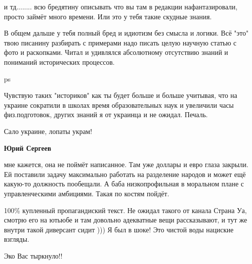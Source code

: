 \begin{itemize}
и тд........ всю бредятину описывать что вы там в редакции нафантазировали,
просто займёт много времени. Или это у тебя такие скудные знания.

В общем дальше у тебя полный бред и идиотизм без смысла и логики. Всё "это"
твою писанину разбирать с примерами надо писать целую научную статью с фото и
раскопками. Читал и удивлялся абсолютному отсутствию знаний и пониманий
исторических процессов.

ps

Чувствую таких "историков" как ты будет больше и больше учитывая, что на
украине сократили в школах время образовательных наук и увеличили часы
физ.подготовок, других знаний я от украинца и не ожидал. Печаль.

Сало украине, лопаты украм!🤣

\begin{itemize}
 
\textbf{Юрий Сергеев} 

мне кажется, она не поймёт написанное. Там уже доллары и евро глаза закрыли. Ей
поставили задачу максимально работать на разделение народов и может ещё
какую-то должность пообещали. А баба низкопрофильная в моральном плане с
управленческими амбициями. Такая по костям пойдёт.


 

100\% купленный пропагандиский текст. Не ожидал такого от канала Страна Уа,
смотрю его на ютьюбе и там довольно адекватные вещи рассказывают, и тут же
внутри такой диверсант сидит ))) Я был в шоке! Это чистой воды нациские
взгляды.

\end{itemize}

 
Эко Вас тыркнуло!!


\end{itemize}

